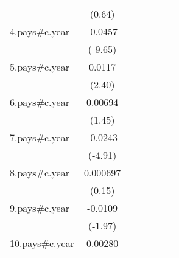 {\begin{tabular}{l*{6}{c}}
                    &      (0.64)         &                     &                     &                     &                     &                     \\
[1em]
4.pays#c.year       &     -0.0457\sym{***}&                     &                     &                     &                     &                     \\
                    &     (-9.65)         &                     &                     &                     &                     &                     \\
[1em]
5.pays#c.year       &      0.0117\sym{*}  &                     &                     &                     &                     &                     \\
                    &      (2.40)         &                     &                     &                     &                     &                     \\
[1em]
6.pays#c.year       &     0.00694         &                     &                     &                     &                     &                     \\
                    &      (1.45)         &                     &                     &                     &                     &                     \\
[1em]
7.pays#c.year       &     -0.0243\sym{***}&                     &                     &                     &                     &                     \\
                    &     (-4.91)         &                     &                     &                     &                     &                     \\
[1em]
8.pays#c.year       &    0.000697         &                     &                     &                     &                     &                     \\
                    &      (0.15)         &                     &                     &                     &                     &                     \\
[1em]
9.pays#c.year       &     -0.0109\sym{*}  &                     &                     &                     &                     &                     \\
                    &     (-1.97)         &                     &                     &                     &                     &                     \\
[1em]
10.pays#c.year      &     0.00280         &                     &                     &                     &                     &                     \\

\end{tabular}}

